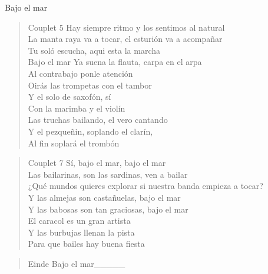 \documentclass[a4paper,11pt]{article}
\begin{document}
\begin{song}{Bajo el mar}

\begin{verse}{Couplet 5}
Hay siempre ritmo y los sentimos al natural\\
La manta raya va a tocar, el esturión va a acompañar\\
Tu soló escucha, aqui esta la marcha\\
Bajo el mar
Ya suena la flauta, carpa en el arpa\\
Al contrabajo ponle atención\\
Oirás las trompetas con el tambor\\
Y el solo de saxofón, sí\\
Con la marimba y el violín\\
Las truchas bailando, el vero cantando\\
Y el pezqueñin, soplando el clarín,\\
Al fin soplará el trombón
\end{verse}


\begin{verse}{Couplet 7}
Sí, bajo el mar, bajo el mar\\
Las bailarinas, son las sardinas, ven a bailar\\
¿Qué mundos quieres explorar si nuestra banda empieza a tocar?\\
Y las almejas son castañuelas, bajo el mar\\
Y las babosas son tan graciosas, bajo el mar\\
El caracol es un gran artista\\
Y las burbujas llenan la pista\\
Para que bailes hay buena fiesta
\end{verse}

\begin{verse}{Einde}
Bajo el mar\_\_\_\_\_
\end{verse}
\end{song}
\end{document}
